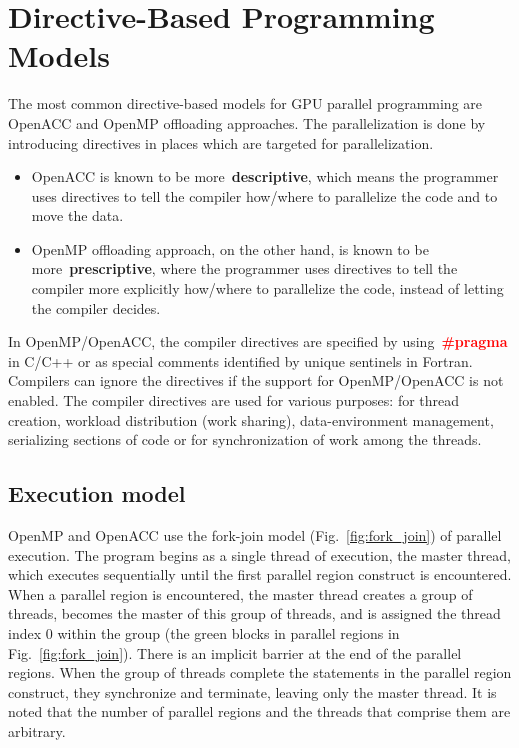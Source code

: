 \section{Directive-Based Programming Models}\label{sec:directive-based-programming-models}


\par
The most common directive-based models for GPU parallel programming are OpenACC and OpenMP offloading approaches.
The parallelization is done by introducing directives in places which are targeted for parallelization.
\begin{itemize}
    \item OpenACC is known to be more~\textbf{descriptive}, which means the programmer uses directives to tell the compiler how/where to parallelize the code and to move the data.
    \item OpenMP offloading approach, on the other hand, is known to be more~\textbf{prescriptive}, where the programmer uses directives to tell the compiler more explicitly how/where to parallelize the code, instead of letting the compiler decides.
\end{itemize}


\par
In OpenMP/OpenACC, the compiler directives are specified by using~\textbf{\textcolor{red}{\#pragma}} in C/C++ or as special comments identified by unique sentinels in Fortran.
Compilers can ignore the directives if the support for OpenMP/OpenACC is not enabled.
The compiler directives are used for various purposes: for thread creation, workload distribution (work sharing), data-environment management, serializing sections of code or for synchronization of work among the threads.




\subsection{Execution model}


\par
OpenMP and OpenACC use the fork-join model (Fig.~\ref{fig:fork_join}) of parallel execution.
The program begins as a single thread of execution, the master thread, which executes sequentially until the first parallel region construct is encountered.
When a parallel region is encountered, the master thread creates a group of threads, becomes the master of this group of threads, and is assigned the thread index 0 within the group (the green blocks in parallel regions in Fig.~\ref{fig:fork_join}).
There is an implicit barrier at the end of the parallel regions.
When the group of threads complete the statements in the parallel region construct, they synchronize and terminate, leaving only the master thread.
It is noted that the number of parallel regions and the threads that comprise them are arbitrary.



